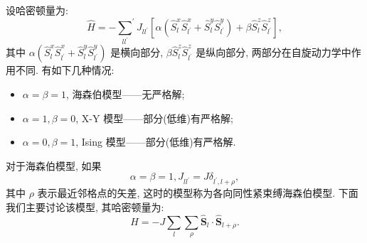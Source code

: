 设哈密顿量为:
\begin{equation}
\hat{H}=-{\sum_{ll^{\prime}}}^{\prime} J_{l l^{\prime}}\left[\alpha\left(\hat{S}_{l}^{x} \hat{S}_{l^{\prime}}^{x}+\hat{S}_{l}^{y} \hat{S}_{l^{\prime}}^{y}\right)+\beta \hat{S}_{l}^{z} \hat{S}_{l^{\prime}}^{z}\right],
\end{equation}
其中 $\alpha\left(\hat{S}_{l}^{x} \hat{S}_{l^{\prime}}^{x}+\hat{S}_{l}^{y} \hat{S}_{l^{\prime}}^{y}\right)$ 是横向部分, $\beta \hat{S}_{l}^{z} \hat{S}_{l^{\prime}}^{z}$ 是纵向部分, 两部分在自旋动力学中作用不同. 有如下几种情况: 
\begin{itemize}
\item $\alpha=\beta=1$, 海森伯模型——无严格解; 
\item $\alpha=1, \beta=0$,  X-Y 模型——部分(低维)有严格解;
\item $\alpha=0, \beta=1$, Ising 模型——部分(低维)有严格解.
\end{itemize}
对于海森伯模型, 如果
\begin{equation}
\alpha=\beta=1, J_{l l^{\prime}}=J \delta_{l^{\prime}, l+\rho},
\end{equation}
其中 $\rho$ 表示最近邻格点的矢差, 这时的模型称为各向同性紧束缚海森伯模型. 下面我们主要讨论该模型, 其哈密顿量为:
\begin{equation}
\hat{H}=-J \sum_{l} \sum_{\rho} \hat{\boldsymbol{S}}_{l} \cdot \hat{\boldsymbol{S}}_{l+\rho}.
\end{equation}

